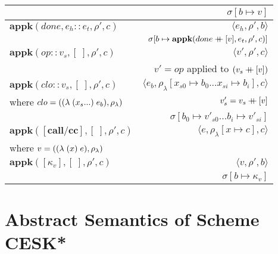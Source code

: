 \documentclass[12pt,draft]{article}
\begin{document}
\begin{center}
\begin{tabular}{@{}l | r@{}}
& $ \sigma[b \mapsto v] $ \\
\hline
$ \textbf{appk}(done, e_h::e_t , \rho' , c) $
& $\langle e_h , \rho' , b \rangle$ \\
& $ \sigma[b \mapsto \textbf{appk}(done \mathbin{+\mkern-9mu+} [v] , e_t , \rho' , c)] $ \\
\hline
$ \textbf{appk}(op :: v_s , [\;] , \rho' , c) $
& $\langle v' , \rho' , c \rangle$ \\
& $ v' = op $ applied to $(v_s \mathbin{+\mkern-9mu+} [v])$ \\
\hline
$ \textbf{appk}(clo :: v_s, [\;] , \rho' , c) $
& $\langle e_b , \rho_{\lambda}[x_{s0} \mapsto b_0 ... x_{si} \mapsto b_i] , c \rangle$ \\
where $ clo = ((\lambda\;(x_s ...)\;e_b) , \rho_{\lambda}) $ & $ v'_s = v_s \mathbin{+\mkern-9mu+} [v] $ \\
& $ \sigma[b_0 \mapsto v'_{s0} ... b_i \mapsto v'_{si}] $  \\
\hline
$\textbf{appk}([\textbf{call/cc}] , [\;] , \rho' , c)$
&$\langle
e , \rho_{\lambda}[x \mapsto c] , c
\rangle$ \\
where $v = ((\lambda\;(x)\;e) , \rho_{\lambda})$\\
\hline
$\textbf{appk}([\kappa_v] , [\;] , \rho' , c)$
&$\langle
v , \rho' , b
\rangle$\\
&$\sigma[b \mapsto \kappa_v]$ \\
\hline
\end{tabular}
\end{center}

\newpage

\section{Abstract Semantics of Scheme CESK*}
\end{document}
